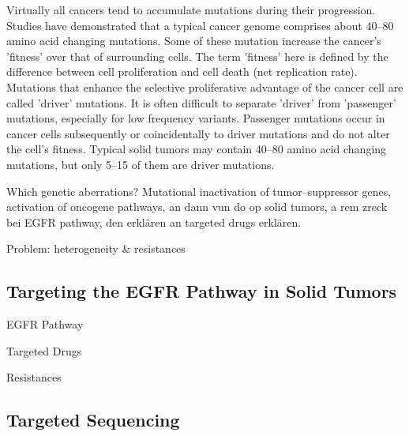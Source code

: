     Virtually all cancers tend to accumulate mutations during their progression.
    Studies have demonstrated that a typical cancer genome comprises about
    40--80 amino acid changing mutations. Some of these mutation increase the
    cancer's 'fitness' over that of  surrounding cells. The term 'fitness'
    here is defined by the difference between cell proliferation and cell death
    (net replication rate). Mutations that enhance the selective proliferative
    advantage of the cancer cell are called 'driver' mutations. It is often
    difficult to separate 'driver' from 'passenger' mutations, especially
    for low frequency variants. Passenger mutations occur in cancer cells
    subsequently or coincidentally to driver mutations and do not alter the cell's
    fitness. Typical solid tumors may contain 40--80 amino acid changing mutations,
    but only 5--15 of them are driver mutations.

    Which genetic aberrations? Mutational inactivation of tumor--suppressor genes,
    activation of oncogene pathways, an dann vun do op solid tumors, a rem
    zreck bei EGFR pathway, den erklären an targeted drugs erklären.

    Problem: heterogeneity & resistances

  \subsection{Targeting the EGFR Pathway in Solid Tumors}

    EGFR Pathway

    Targeted Drugs

    Resistances

  \subsection{Targeted Sequencing}

